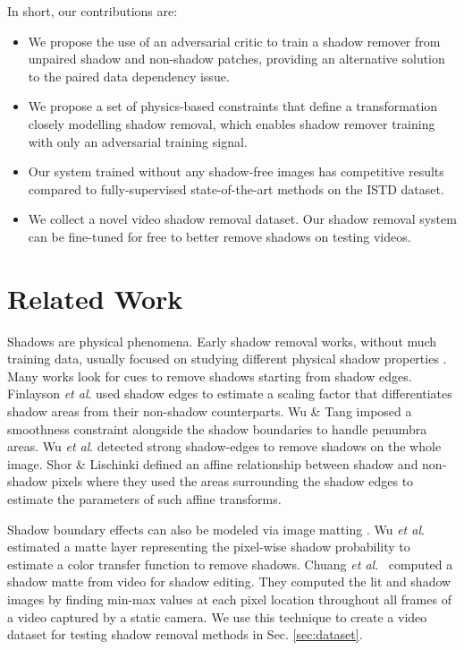 \documentclass[runningheads]{llncs}
\def\etal{\emph{et al}.}
\begin{document}
In short, our contributions are:
\begin{itemize}
    \item We propose the use of an adversarial critic to train a shadow remover from unpaired shadow and non-shadow patches, providing an alternative solution to the paired data dependency issue.\item We propose a set of physics-based constraints that define a transformation closely modelling shadow removal, which enables shadow remover training with only an adversarial training signal.
    \item Our system trained without any shadow-free images has competitive results compared to fully-supervised state-of-the-art methods on the ISTD dataset. 
    \item We collect a novel video shadow removal dataset. Our shadow removal system can be fine-tuned for free to better remove shadows on testing videos. 
\end{itemize}

\section{Related Work}
\label{sec:related}
Shadows are  physical phenomena. Early shadow removal works, without much training data, usually focused on studying different physical  shadow properties \cite{Finlayson06,Finlayson01,Finlayson02,Drew03recoveryof,Arbel2011ShadowRU,Fredembach2005HamiltonianPB,Liu2008TextureConsistentSR,Yang12}. Many works look for cues to remove shadows starting from shadow edges. Finlayson \etal \cite{Finlayson02} used shadow edges to estimate a scaling factor that differentiates  shadow areas from their non-shadow counterparts. Wu \& Tang \cite{Wu2005ABA} imposed a smoothness constraint alongside the shadow boundaries to handle  penumbra areas. Wu \etal\cite{Wu2012StrongSR} detected strong shadow-edges to remove shadows on the whole image. Shor \& Lischinki \cite{Shor08} defined an affine relationship between shadow and non-shadow pixels where they used the areas surrounding the shadow edges to estimate the parameters of such affine transforms. \par Shadow boundary effects  can also be modeled via image matting \cite{guoPami}. Wu \etal\cite{Wu07} estimated a matte layer representing the pixel-wise shadow probability to estimate a color transfer function to remove  shadows. Chuang \etal~\cite{Chuang2003} computed a shadow matte from video for shadow editing. They computed the lit and shadow images by finding min-max values at each pixel location throughout all frames of a video captured by a static camera. We use this technique to create a video dataset for testing shadow removal methods in Sec. \ref{sec:dataset}.
 
\end{document}

